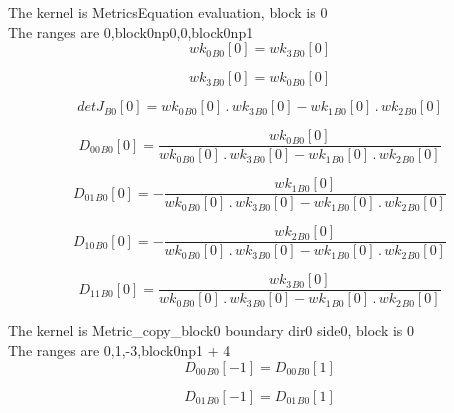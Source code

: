 \documentclass{article}
\begin{document}
\noindent The kernel is MetricsEquation evaluation, block is 0\\\noindent The ranges are 0,block0np0,0,block0np1\\\begin{dmath}{wk_{0}{_{B0}}}[{0}] = {wk_{3}{_{B0}}}[{0}]\end{dmath}

\begin{dmath}{wk_{3}{_{B0}}}[{0}] = {wk_{0}{_{B0}}}[{0}]\end{dmath}

\begin{dmath}{detJ{_{B0}}}[{0}] = {wk_{0}{_{B0}}}[{0}] \,.\, {wk_{3}{_{B0}}}[{0}] - {wk_{1}{_{B0}}}[{0}] \,.\, {wk_{2}{_{B0}}}[{0}]\end{dmath}

\begin{dmath}{D_{00}{_{B0}}}[{0}] = \frac{{wk_{0}{_{B0}}}[{0}]}{{wk_{0}{_{B0}}}[{0}] \,.\, {wk_{3}{_{B0}}}[{0}] - {wk_{1}{_{B0}}}[{0}] \,.\, {wk_{2}{_{B0}}}[{0}]}\end{dmath}

\begin{dmath}{D_{01}{_{B0}}}[{0}] = - \frac{{wk_{1}{_{B0}}}[{0}]}{{wk_{0}{_{B0}}}[{0}] \,.\, {wk_{3}{_{B0}}}[{0}] - {wk_{1}{_{B0}}}[{0}] \,.\, {wk_{2}{_{B0}}}[{0}]}\end{dmath}

\begin{dmath}{D_{10}{_{B0}}}[{0}] = - \frac{{wk_{2}{_{B0}}}[{0}]}{{wk_{0}{_{B0}}}[{0}] \,.\, {wk_{3}{_{B0}}}[{0}] - {wk_{1}{_{B0}}}[{0}] \,.\, {wk_{2}{_{B0}}}[{0}]}\end{dmath}

\begin{dmath}{D_{11}{_{B0}}}[{0}] = \frac{{wk_{3}{_{B0}}}[{0}]}{{wk_{0}{_{B0}}}[{0}] \,.\, {wk_{3}{_{B0}}}[{0}] - {wk_{1}{_{B0}}}[{0}] \,.\, {wk_{2}{_{B0}}}[{0}]}\end{dmath}

\noindent The kernel is Metric_copy_block0 boundary dir0 side0, block is 0\\\noindent The ranges are 0,1,-3,block0np1 + 4\\\begin{dmath}{D_{00}{_{B0}}}[{-1}] = {D_{00}{_{B0}}}[{1}]\end{dmath}

\begin{dmath}{D_{01}{_{B0}}}[{-1}] = {D_{01}{_{B0}}}[{1}]\end{dmath}
\end{document}
